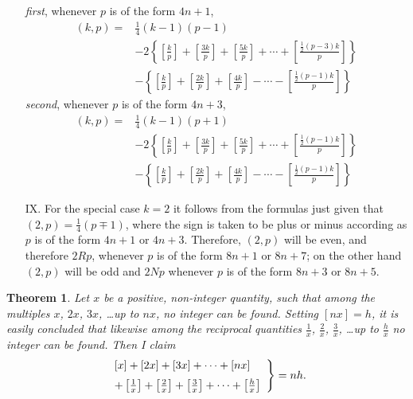 \documentclass{book}
\theoremstyle{plain}
\newtheorem*{theorem}{Theorem}
\theoremstyle{remark}
\begin{document}
\begin{enumerate}
 \;\; \emph{first}, whenever $p$ is of the form $4n+1$,
 \begin{align*} (k,p) =& \tfrac{1}{4}(k-1)(p-1) \\
&-2\left\{ \left[ \frac{k}{p} \right] + \left[ \frac{3k}{p} \right] + \left[ \frac{5k}{p} \right] + \cdots + \left[ \frac{\frac{1}{2}(p-3)k}{p} \right]    \right\} \\
&- \left\{ \left[ \frac{k}{p} \right] + \left[ \frac{2k}{p} \right] + \left[ \frac{4k}{p} \right] - \cdots - \left[ \frac{\frac{1}{2}(p-1)k}{p} \right] \right\} \end{align*}
 \;\; \emph{second}, whenever $p$ is of the form $4n+3$,
 \begin{align*} (k,p) =& \tfrac{1}{4}(k-1)(p+1) \\
&-2\left\{ \left[ \frac{k}{p} \right] + \left[ \frac{3k}{p} \right] + \left[ \frac{5k}{p} \right] + \cdots + \left[ \frac{\frac{1}{2}(p-1)k}{p} \right]    \right\} \\
&- \left\{ \left[ \frac{k}{p} \right] + \left[ \frac{2k}{p} \right] + \left[ \frac{4k}{p} \right] - \cdots - \left[ \frac{\frac{1}{2}(p-1)k}{p} \right] \right\} \end{align*}

\item[IX.] For the special case $k=2$ it follows from the formulas just given that $(2,p) = \tfrac{1}{4}(p\mp 1)$, where the sign is taken to be plus or minus according as $p$ is of the form $4n+1$ or $4n+3$.   Therefore, $(2,p)$ will be even, and therefore $2Rp$, whenever $p$ is of the form $8n+1$ or $8n + 7$; on the other hand $(2,p)$ will be odd and $2Np$ whenever $p$ is of the form $8n+3$ or $8n+5$.
\end{enumerate}
\begin{theorem} Let $x$ be a positive, non-integer quantity, such that among the multiples $x$, $2x$, $3x$, \dots up to $nx$, no integer can be found.   Setting $[nx] = h$, it is easily concluded that likewise among the reciprocal quantities $\frac{1}{x}$, $\frac{2}{x}$, $\frac{3}{x}$, \dots up to $\frac{h}{x}$ no integer can be found.  Then I claim
\[ \left. \begin{array}{l} [x] + [2x] + [3x] + \cdots + [nx] \vspace{2mm} \\ + \left[\frac{1}{x}\right] + \left[ \frac{2}{x} \right] + \left[\frac{3}{x} \right] + \cdots + \left[\frac{h}{x}\right] \end{array} \right\} = nh . \]
\end{theorem}
\end{document}
